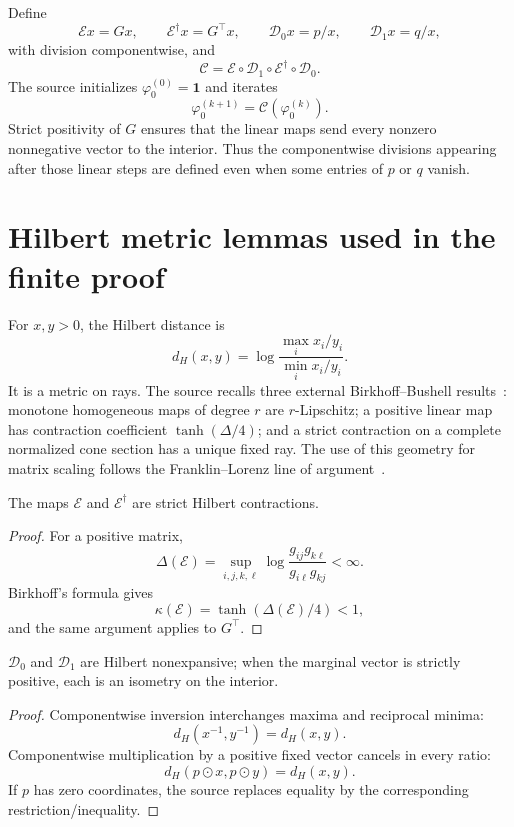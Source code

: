 Define
\[
 \mathcal E x=Gx,
 \qquad \mathcal E^\dagger x=G^\top x,
 \qquad \mathcal D_0x=p/x,
 \qquad \mathcal D_1x=q/x,
\]
with division componentwise, and
\begin{equation}
 \mathcal C=\mathcal E\circ\mathcal D_1\circ
              \mathcal E^\dagger\circ\mathcal D_0.
 \label{eq:CGP-composition}
\end{equation}
The source initializes $\varphi_0^{(0)}=\mathbf1$ and iterates
\begin{equation}
 \varphi_0^{(k+1)}=\mathcal C(\varphi_0^{(k)}).
 \label{eq:CGP-iteration}
\end{equation}
Strict positivity of $G$ ensures that the linear maps send every nonzero nonnegative vector to the
interior.  Thus the componentwise divisions appearing after those linear steps are defined even
when some entries of $p$ or $q$ vanish.

\section{Hilbert metric lemmas used in the finite proof}
For $x,y>0$, the Hilbert distance is
\[
 d_H(x,y)=\log\frac{\max_i x_i/y_i}{\min_i x_i/y_i}.
\]
It is a metric on rays.  The source recalls three external Birkhoff--Bushell results~\cite{Birkhoff1957,Bushell1973Projective,Bushell1973Hilbert}: monotone
homogeneous maps of degree $r$ are $r$-Lipschitz; a positive linear map has contraction coefficient
$\tanh(\Delta/4)$; and a strict contraction on a complete normalized cone section has a unique
fixed ray.  The use of this geometry for matrix scaling follows the Franklin--Lorenz line of argument~\cite{FranklinLorenz1989}.

\begin{lemma}
The maps $\mathcal E$ and $\mathcal E^\dagger$ are strict Hilbert contractions.
\end{lemma}
\begin{proof}
For a positive matrix,
\[
 \Delta(\mathcal E)
 =\sup_{i,j,k,\ell}
 \log\frac{g_{ij}g_{k\ell}}{g_{i\ell}g_{kj}}<\infty.
\]
Birkhoff's formula gives
\[
 \kappa(\mathcal E)=\tanh(\Delta(\mathcal E)/4)<1,
\]
and the same argument applies to $G^\top$.
\end{proof}

\begin{lemma}
$\mathcal D_0$ and $\mathcal D_1$ are Hilbert nonexpansive; when the marginal vector is strictly
positive, each is an isometry on the interior.
\end{lemma}
\begin{proof}
Componentwise inversion interchanges maxima and reciprocal minima:
\[
 d_H(x^{-1},y^{-1})=d_H(x,y).
\]
Componentwise multiplication by a positive fixed vector cancels in every ratio:
\[
 d_H(p\odot x,p\odot y)=d_H(x,y).
\]
If $p$ has zero coordinates, the source replaces equality by the corresponding restriction/inequality.
\end{proof}

